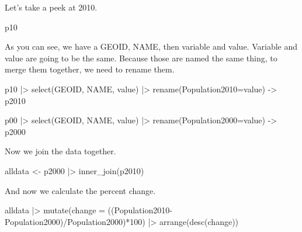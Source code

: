 \documentclass[
  letterpaper,
  DIV=11,
  numbers=noendperiod]{scrreprt}
\newenvironment{Shaded}{\begin{snugshade}}{\end{snugshade}}
\newcommand{\AttributeTok}[1]{\textcolor[rgb]{0.40,0.45,0.13}{#1}}
\newcommand{\DecValTok}[1]{\textcolor[rgb]{0.68,0.00,0.00}{#1}}
\newcommand{\FunctionTok}[1]{\textcolor[rgb]{0.28,0.35,0.67}{#1}}
\newcommand{\NormalTok}[1]{\textcolor[rgb]{0.00,0.23,0.31}{#1}}
\newcommand{\OtherTok}[1]{\textcolor[rgb]{0.00,0.23,0.31}{#1}}
\newcommand{\SpecialCharTok}[1]{\textcolor[rgb]{0.37,0.37,0.37}{#1}}
\begin{document}
Let's take a peek at 2010.

\begin{Shaded}
\begin{Highlighting}[]
\NormalTok{p10}
\end{Highlighting}
\end{Shaded}

As you can see, we have a GEOID, NAME, then variable and value. Variable
and value are going to be the same. Because those are named the same
thing, to merge them together, we need to rename them.

\begin{Shaded}
\begin{Highlighting}[]
\NormalTok{p10 }\SpecialCharTok{|\textgreater{}} \FunctionTok{select}\NormalTok{(GEOID, NAME, value) }\SpecialCharTok{|\textgreater{}} \FunctionTok{rename}\NormalTok{(}\AttributeTok{Population2010=}\NormalTok{value) }\OtherTok{{-}\textgreater{}}\NormalTok{ p2010}

\NormalTok{p00 }\SpecialCharTok{|\textgreater{}} \FunctionTok{select}\NormalTok{(GEOID, NAME, value) }\SpecialCharTok{|\textgreater{}} \FunctionTok{rename}\NormalTok{(}\AttributeTok{Population2000=}\NormalTok{value) }\OtherTok{{-}\textgreater{}}\NormalTok{ p2000}
\end{Highlighting}
\end{Shaded}

Now we join the data together.

\begin{Shaded}
\begin{Highlighting}[]
\NormalTok{alldata }\OtherTok{\textless{}{-}}\NormalTok{ p2000 }\SpecialCharTok{|\textgreater{}} \FunctionTok{inner\_join}\NormalTok{(p2010)}
\end{Highlighting}
\end{Shaded}

And now we calculate the percent change.

\begin{Shaded}
\begin{Highlighting}[]
\NormalTok{alldata }\SpecialCharTok{|\textgreater{}} \FunctionTok{mutate}\NormalTok{(}\AttributeTok{change =}\NormalTok{ ((Population2010}\SpecialCharTok{{-}}\NormalTok{Population2000)}\SpecialCharTok{/}\NormalTok{Population2000)}\SpecialCharTok{*}\DecValTok{100}\NormalTok{) }\SpecialCharTok{|\textgreater{}} \FunctionTok{arrange}\NormalTok{(}\FunctionTok{desc}\NormalTok{(change))}
\end{Highlighting}
\end{Shaded}
\end{document}
